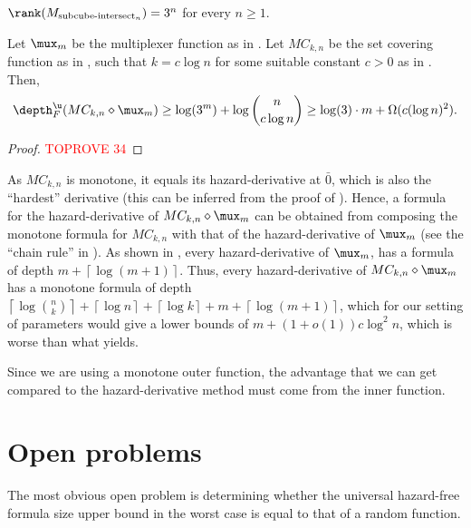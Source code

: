 \documentclass[acmsmall, nonacm, authorversion]{acmart}
\begin{document}
\begin{lemma}[{\cite[Lemma 5.12]{IK23}}]\label{lem:rank-subcube-intersect}
$\rank(M_{\text{subcube-intersect}_n})=3^n$ for every $n\ge1$.
\end{lemma}

\begin{proposition}
    \label{prop:comp-monotone-mux}
Let $\mux_m$ be the multiplexer function as in . Let $MC_{k,n}$ be the set covering function as in , such that $k=c\log n$ for some suitable constant $c>0$ as in . Then,
\[
\depth_{F}^\u(MC_{k,n} \diamond \mux_m) \ge \log(3^m)+\log\binom{n}{c \log n} \ge\log(3)\cdot m +\Omega(c(\log n)^2).
\]
\end{proposition}
\begin{proof}\textcolor{red}{TOPROVE 34}\end{proof}

\begin{remark}
    As $MC_{k,n}$ is monotone, it equals its hazard-derivative at  $\bar{0}$, which is also the ``hardest'' derivative (this can be inferred from the proof of ). Hence, a formula for the hazard-derivative of $MC_{k,n} \diamond \mux_m$ can be obtained from composing the monotone formula for $MC_{k,n}$ with that of the hazard-derivative of $\mux_m$ (see the ``chain rule'' in \cite[Lemma 4.7]{IKL+19}).
    As shown in \cite[Proposition 1]{IK23}, every hazard-derivative of $\mux_m$, has a formula of depth $m+\left\lceil \log (m +1)\right\rceil$. Thus, every hazard-derivative of $MC_{k,n} \diamond \mux_m$ has a monotone formula of depth $\left\lceil\log \binom{n}{k}\right\rceil +\left\lceil \log n\right\rceil+\left\lceil \log k\right\rceil+m+\left\lceil \log (m +1)\right\rceil$, 
    which for our setting of parameters would give a lower bounds of $m + (1+o(1))c\log^2 n $, which is worse than what  yields. 
\end{remark}

\begin{remark}
    Since we are using a monotone outer function, the advantage that we can get compared to the hazard-derivative method must come from the inner function.
\end{remark}

\section{Open problems}\label{sec:open}
The most obvious open problem is determining whether the universal hazard-free formula size upper bound in the worst case is equal to that of a random function.
\end{document}
